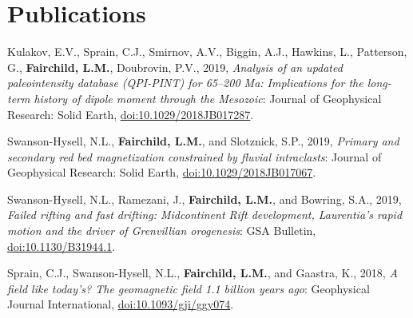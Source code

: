 \documentclass[10pt,a4paper,sans]{moderncv}
\begin{document}


\section{Publications}
\begin{etaremune}[itemsep=3pt]

\item{Kulakov, E.V., Sprain, C.J., Smirnov, A.V., Biggin, A.J.,  Hawkins, L.,
     Patterson, G., \textbf{Fairchild, L.M.}, Doubrovin, P.V., 2019,
     \textit{Analysis of an updated paleointensity database (QPI-PINT) for
     65--200 Ma: Implications for the long-term history of dipole moment through
 the Mesozoic}: Journal of Geophysical Research: Solid Earth,
 {\color{cyan}\href{https://doi.org/10.1029/2018JB017287}
               {doi:10.1029/2018JB017287}}.}



 \item{Swanson-Hysell, N.L., \textbf{Fairchild, L.M.}, and Slotznick, S.P.,
         2019, \textit{Primary and secondary red bed magnetization constrained
         by fluvial intraclasts}: Journal of Geophysical Research: Solid Earth,
         {\color{cyan}\href{https://doi.org/10.1029/2018JB017067}
     {doi:10.1029/2018JB017067}}.}

 \item{Swanson-Hysell, N.L., Ramezani, J., \textbf{Fairchild, L.M.}, and
         Bowring, S.A., 2019, \textit{Failed rifting and fast drifting:
             Midcontinent Rift development, Laurentia's rapid motion and the
         driver of Grenvillian orogenesis}: GSA Bulletin,
         {\color{cyan}\href{https://doi.org/10.1130/B31944.1}
     {doi:10.1130/B31944.1}}.}

 \item{Sprain, C.J., Swanson-Hysell, N.L., \textbf{Fairchild, L.M.}, and
         Gaastra, K., 2018, \textit{A field like today's? The geomagnetic field
         1.1 billion years ago}: Geophysical Journal International,
         {\color{cyan}\href{https://doi.org/10.1093/gji/ggy074}
     {doi:10.1093/gji/ggy074}}.}


\end{etaremune}
\end{document}
